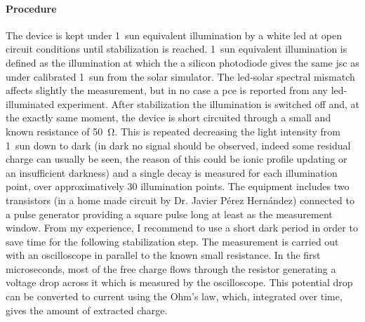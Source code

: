 	
	\paragraph{Procedure}
	The device is kept under 1~sun equivalent illumination by a white \gls{led} at open circuit conditions until stabilization is reached.
	1~sun equivalent illumination is defined as the illumination at which the a silicon photodiode gives the same \gls{jsc} as under calibrated 1~sun from the solar simulator.
	The \gls{led}-solar spectral mismatch affects slightly the measurement, but in no case a \gls{pce} is reported from any \gls{led}-illuminated experiment.
	After stabilization the illumination is switched off and, at the exactly same moment, the device is short circuited through a small and known resistance of \SI{50}{\ohm}.
	This is repeated decreasing the light intensity from 1~sun down to dark (in dark no signal should be observed, indeed some residual charge can usually be seen, the reason of this could be ionic profile updating or an insufficient darkness) and a single decay is measured for each illumination point, over approximatively 30 illumination points.
	The equipment includes two transistors (in a home made circuit by Dr. Javier Pérez Hernández) connected to a pulse generator providing a square pulse long at least as the measurement window.
	From my experience, I recommend to use a short dark period in order to save time for the following stabilization step.
	The measurement is carried out with an oscilloscope in parallel to the known small resistance.
	In the first microseconds, most of the free charge flows through the resistor generating a voltage drop across it which is measured by the oscilloscope.
	This potential drop can be converted to current using the Ohm's law, which, integrated over time, gives the amount of extracted charge.

